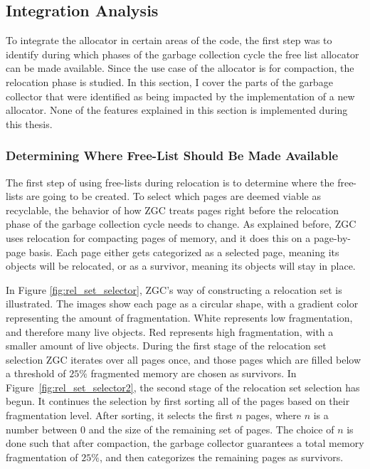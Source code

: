 \subsection{Integration Analysis}
To integrate the allocator in certain areas of the code, the first step was to identify during which phases of the garbage collection cycle the free list allocator can be made available. Since the use case of the allocator is for compaction, the relocation phase is studied. In this section, I cover the parts of the garbage collector that were identified as being impacted by the implementation of a new allocator. None of the features explained in this section is implemented during this thesis.

\subsubsection{Determining Where Free-List Should Be Made Available}
\label{sec:analyse-select}
The first step of using free-lists during relocation is to determine where the free-lists are going to be created. To select which pages are deemed viable as recyclable, the behavior of how ZGC treats pages right before the relocation phase of the garbage collection cycle needs to change. As explained before, ZGC uses relocation for compacting pages of memory, and it does this on a page-by-page basis. Each page either gets categorized as a selected page, meaning its objects will be relocated, or as a survivor, meaning its objects will stay in place. 

In Figure \ref{fig:rel_set_selector}, ZGC's way of constructing a relocation set is illustrated. The images show each page as a circular shape, with a gradient color representing the amount of fragmentation. White represents low fragmentation, and therefore many live objects. Red represents high fragmentation, with a smaller amount of live objects. During the first stage of the relocation set selection ZGC iterates over all pages once, and those pages which are filled below a threshold of $25\%$ fragmented memory are chosen as survivors. In Figure~\ref{fig:rel_set_selector2}, the second stage of the relocation set selection has begun. It continues the selection by first sorting all of the pages based on their fragmentation level. After sorting, it selects the first $n$ pages, where $n$ is a number between 0 and the size of the remaining set of pages. The choice of $n$ is done such that after compaction, the garbage collector guarantees a total memory fragmentation of $25\%$, and then categorizes the remaining pages as survivors.

